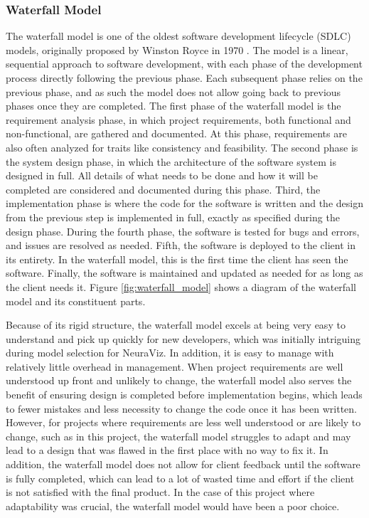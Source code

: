 \subsubsection{Waterfall Model}
The waterfall model is one of the oldest software development lifecycle (SDLC) models, originally proposed by Winston Royce in 1970 \cite{Gagan2020}. The model is a linear, sequential approach to software development, with each phase of the development process directly following the previous phase. Each subsequent phase relies on the previous phase, and as such the model does not allow going back to previous phases once they are completed. The first phase of the waterfall model is the requirement analysis phase, in which project requirements, both functional and non-functional, are gathered and documented. At this phase, requirements are also often analyzed for traits like consistency and feasibility. The second phase is the system design phase, in which the architecture of the software system is designed in full. All details of what needs to be done and how it will be completed are considered and documented during this phase. Third, the implementation phase is where the code for the software is written and the design from the previous step is implemented in full, exactly as specified during the design phase. During the fourth phase, the software is tested for bugs and errors, and issues are resolved as needed. Fifth, the software is deployed to the client in its entirety. In the waterfall model, this is the first time the client has seen the software. Finally, the software is maintained and updated as needed for as long as the client needs it. Figure \ref{fig:waterfall_model} shows a diagram of the waterfall model and its constituent parts.

Because of its rigid structure, the waterfall model excels at being very easy to understand and pick up quickly for new developers, which was initially intriguing during model selection for NeuraViz. In addition, it is easy to manage with relatively little overhead in management. When project requirements are well understood up front and unlikely to change, the waterfall model also serves the benefit of ensuring design is completed before implementation begins, which leads to fewer mistakes and less necessity to change the code once it has been written. However, for projects where requirements are less well understood or are likely to change, such as in this project, the waterfall model struggles to adapt and may lead to a design that was flawed in the first place with no way to fix it. In addition, the waterfall model does not allow for client feedback until the software is fully completed, which can lead to a lot of wasted time and effort if the client is not satisfied with the final product. In the case of this project where adaptability was crucial, the waterfall model would have been a poor choice.

